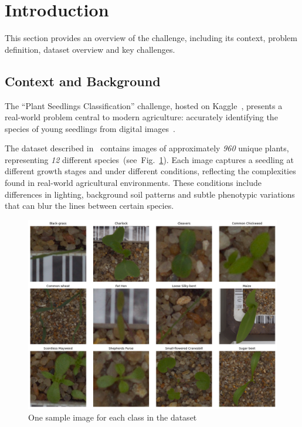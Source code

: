 \section{Introduction}

This section provides an overview of the challenge, including its context, problem definition, dataset overview and key challenges.

\subsection{Context and Background}
The ``Plant Seedlings Classification'' challenge, hosted on Kaggle~\cite{plant-seedlings-classification}, presents a real-world problem central to modern agriculture: accurately identifying the species of young seedlings from digital images~\cite{MESHRAM2021100010}.

The dataset described in~\cite{DBLP:journals/corr/abs-1711-05458} contains images of approximately \textit{960} unique plants, representing \textit{12} different species~(see~Fig.~\ref{fig:sample-images}). Each image captures a seedling at different growth stages and under different conditions, reflecting the complexities found in real-world agricultural environments. These conditions include differences in lighting, background soil patterns and subtle phenotypic variations that can blur the lines between certain species.

\begin{figure}[htbp]
    \centerline{\includegraphics[width=0.9\linewidth]{../../resources/sample_images.png}}
    \caption{One sample image for each class in the dataset}
    \label{fig:sample-images}
\end{figure}

